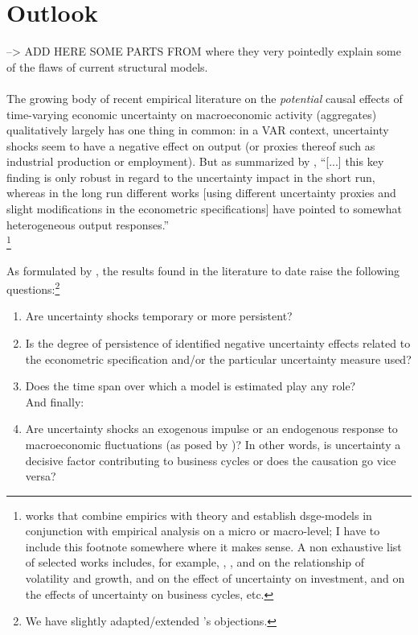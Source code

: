\documentclass[a4paper,11pt,listof=nochaptergap,oneside,pointednumbers,bibtotoc,bigheadings,liststotoc]{scrbook}
\theoremstyle{mysatz}
\theoremstyle{mydefinition}
\theoremstyle{mybemerkung}
\begin{document}
\section{Outlook}
--> ADD HERE SOME PARTS FROM \citet{ludvigsonetal:18} where they very pointedly explain some of the flaws of current structural models.\\
\\
The growing body of recent empirical literature on the \textit{potential} causal effects of time-varying economic uncertainty on macroeconomic activity (aggregates) qualitatively largely has one thing in common: in a VAR context, uncertainty shocks seem to have a negative effect on output (or proxies thereof such as industrial production or employment). But as summarized by \citet[p. 23]{bontempietal:16}, ``[...] this key finding is only robust in regard to the uncertainty impact in the short run, whereas in the long run different works [using different uncertainty proxies and slight modifications in the econometric specifications] have pointed to somewhat heterogeneous output responses.''\\
\footnote{works that combine empirics with theory and establish dsge-models in conjunction with empirical analysis on a micro or macro-level; I have to include this footnote somewhere where it makes sense. A non exhaustive list of selected works includes, for example, \citet{rameyandramey:95}, \citet{aghionetal:05}, \citet{mills:00} and \citet{imbs:07} on the relationship of volatility and growth, \citet{leahyandwhited:96} and \citet{bloometal:07} on the effect of uncertainty on investment, \citet{barlevy:04} and \citet{gilchristandwilliams:05} on the effects of uncertainty on business cycles, etc.}


As formulated by \citet[p. 24]{bontempietal:16}, the results found in the literature to date raise the following questions:\footnote{We have slightly adapted/extended \citet{bontempietal:16}'s objections.}
\begin{enumerate}
	\item Are uncertainty shocks temporary or more persistent?
	\item Is the degree of persistence of identified negative uncertainty effects related to the econometric specification and/or the particular uncertainty measure used? 
	\item Does the time span over which a model is estimated play any role? \\
	And finally:
	\item Are uncertainty shocks an exogenous impulse or an endogenous response to macroeconomic fluctuations (as posed by \citealp{ludvigsonetal:18})? In other words, is uncertainty a decisive factor contributing to business cycles or does the causation go vice versa?
\end{enumerate}
\end{document}
